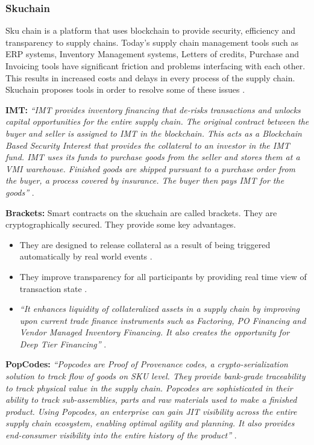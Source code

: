 \subsubsection{Skuchain}
Sku chain is a platform that uses blockchain to provide security, efficiency and transparency to supply chains. Today’s supply chain management tools such as ERP systems, Inventory Management systems, Letters of credits, Purchase and Invoicing tools have significant friction and problems interfacing with each other. This results in increased costs and delays in every process of the supply chain. Skuchain proposes tools in order to resolve some of these issues \cite{misc:015}.

\textbf{IMT:}
\textit{“IMT provides inventory financing that de-risks transactions and unlocks capital opportunities for the entire supply chain. The original contract between the buyer and seller is assigned to IMT in the blockchain. This acts as a Blockchain Based Security Interest that provides the collateral to an investor in the IMT fund. IMT uses its funds to purchase goods from the seller and stores them at a VMI warehouse. Finished goods are shipped pursuant to a purchase order from the buyer, a process covered by insurance. The buyer then pays IMT for the goods”} \cite{misc:015}.

\textbf{Brackets:}
Smart contracts on the skuchain are called brackets. They are cryptographically secured. They provide some key advantages. 

\begin{itemize}

\item They are designed to release collateral as a result of being triggered automatically by real world events \cite{misc:015}. 
\item  They improve transparency for all participants by providing real time view of transaction state \cite{misc:015}. 
\item  \textit{“It enhances liquidity of collateralized assets in a supply chain by improving upon current trade finance instruments such as Factoring, PO Financing and Vendor Managed Inventory Financing. It also creates the opportunity for Deep Tier Financing”} \cite{misc:015}. 
\end{itemize}

\textbf{PopCodes:}
\textit{“Popcodes are Proof of Provenance codes, a crypto-serialization solution to track flow of goods on SKU level. They provide bank-grade traceability to track physical value in the supply chain. Popcodes are sophisticated in their ability to track sub-assemblies, parts and raw materials used to make a finished product. Using Popcodes, an enterprise can gain JIT visibility across the entire supply chain ecosystem, enabling optimal agility and planning. It also provides end-consumer visibility into the entire history of the product”} \cite{misc:015}.
\vspace{0.5cm}  
